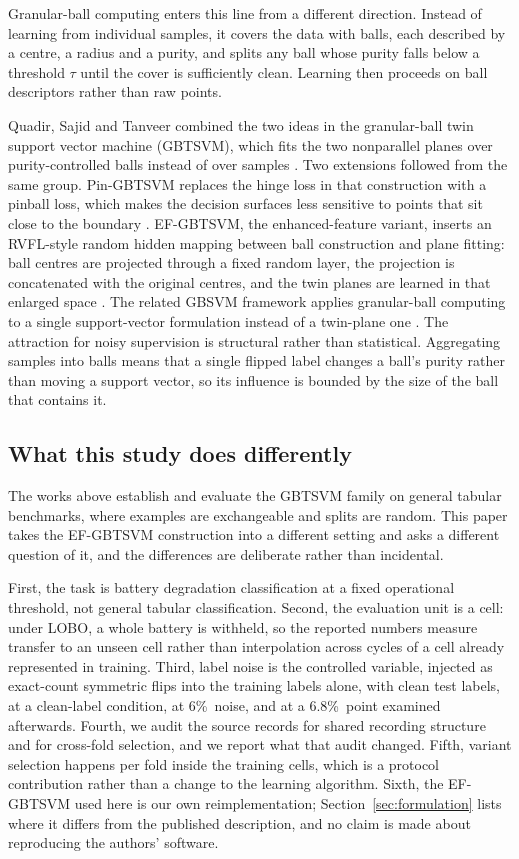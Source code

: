 \documentclass[final,5p,times,twocolumn]{elsarticle}
\newcommand{\nz}{\%}
\begin{document}
Granular-ball computing \cite{xia2019gb} enters this line from a different direction. Instead of learning from individual samples, it covers the data with balls, each described by a centre, a radius and a purity, and splits any ball whose purity falls below a threshold $\tau$ until the cover is sufficiently clean. Learning then proceeds on ball descriptors rather than raw points.

Quadir, Sajid and Tanveer combined the two ideas in the granular-ball twin support vector machine (GBTSVM), which fits the two nonparallel planes over purity-controlled balls instead of over samples \cite{quadir2025gb}. Two extensions followed from the same group. Pin-GBTSVM replaces the hinge loss in that construction with a pinball loss, which makes the decision surfaces less sensitive to points that sit close to the boundary \cite{quadir2025pin}. EF-GBTSVM, the enhanced-feature variant, inserts an RVFL-style random hidden mapping between ball construction and plane fitting: ball centres are projected through a fixed random layer, the projection is concatenated with the original centres, and the twin planes are learned in that enlarged space \cite{quadir2025ef}. The related GBSVM framework applies granular-ball computing to a single support-vector formulation instead of a twin-plane one \cite{xia2025gbsvm}. The attraction for noisy supervision is structural rather than statistical. Aggregating samples into balls means that a single flipped label changes a ball's purity rather than moving a support vector, so its influence is bounded by the size of the ball that contains it.

\subsection{What this study does differently}
The works above establish and evaluate the GBTSVM family on general tabular benchmarks, where examples are exchangeable and splits are random. This paper takes the EF-GBTSVM construction into a different setting and asks a different question of it, and the differences are deliberate rather than incidental.

First, the task is battery degradation classification at a fixed operational threshold, not general tabular classification. Second, the evaluation unit is a cell: under LOBO, a whole battery is withheld, so the reported numbers measure transfer to an unseen cell rather than interpolation across cycles of a cell already represented in training. Third, label noise is the controlled variable, injected as exact-count symmetric flips into the training labels alone, with clean test labels, at a clean-label condition, at 6\nz\ noise, and at a 6.8\nz\ point examined afterwards. Fourth, we audit the source records for shared recording structure and for cross-fold selection, and we report what that audit changed. Fifth, variant selection happens per fold inside the training cells, which is a protocol contribution rather than a change to the learning algorithm. Sixth, the EF-GBTSVM used here is our own reimplementation; Section~\ref{sec:formulation} lists where it differs from the published description, and no claim is made about reproducing the authors' software.
\end{document}
